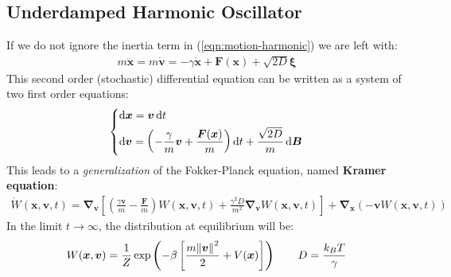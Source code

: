 \documentclass[../template.tex]{subfiles}
\begin{document}
\subsection{Underdamped Harmonic Oscillator}
If we do not ignore the inertia term in (\ref{eqn:motion-harmonic}) we are left with:
\begin{align*}
    m \ddot{\bm{x}} = m \dot{\bm{v}} = -\gamma \bm{\dot{x}} + \bm{F}(\bm{x}) + \sqrt{2D} \bm{\xi}
\end{align*}
This second order (stochastic) differential equation can be written as a system of two first order equations:
\begin{align*}
    \begin{dcases}
        \dd{\bm{x}} = \bm{v} \dd{t}\\
        \dd{\bm{v}} = \left(-\frac{\gamma}{m} \bm{v} + \frac{\bm{F}(\bm{x})}{m}  \right) \dd{t} + \frac{\sqrt{2D}}{m} \dd{\bm{B}} 
    \end{dcases}
\end{align*}
This leads to a \textit{generalization} of the Fokker-Planck equation, named \textbf{Kramer equation}:
\begin{align*}
    \dot{W}(\bm{x}, \bm{v}, t) = \bm{\nabla}_{\bm{v}} \left[\left(\frac{\gamma \bm{v}}{m} - \frac{\bm{F}}{m}  \right) W(\bm{x}, \bm{v},t) + \frac{\gamma^2 D}{m^2} \bm{\nabla}_{\bm{v}} W(\bm{x}, \bm{v},t) \right] + \bm{\nabla}_{\bm{x}} (-\bm{v} W(\bm{x}, \bm{v},t))
\end{align*}  
In the limit $t \to \infty$, the distribution at equilibrium will be:
\begin{align*}
    W(\bm{x},\bm{v}) = \frac{1}{Z} \exp\left(-\beta\left[\frac{m \norm{\bm{v}}^2}{2} + V(\bm{x}) \right]\right)  \qquad D=\frac{k_B T}{\gamma} 
\end{align*}
\end{document}
